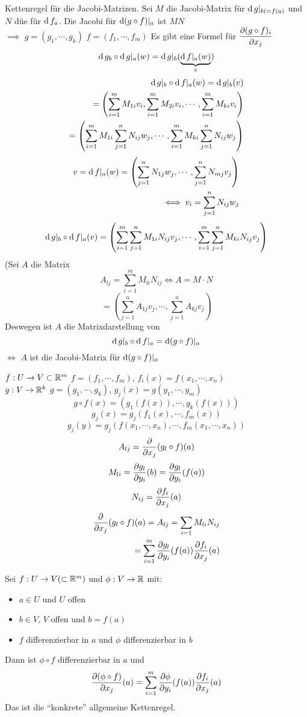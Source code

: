 \begin{Bem}
  Kettenregel für die Jacobi-Matrizen. Sei $M$ die Jacobi-Matrix für $\operatorname{d} g|_{b(=f(a)}$ und $N$ düe für $\operatorname{d} f_a$.
Die Jacobi für $\operatorname{d} (g\circ f)|_a$ ist $MN$ \\
  $\implies$ $g=(g_1,\cdots,g_k)$ $f=(f_1,\cdots,f_m)$ Es gibt eine Formel für $\dfrac{\partial (g\circ f)_i}{\partial x_j}$
  \[\operatorname{d} g_b\circ \operatorname{d} g|_a(w)=\operatorname{d} g|_b(\underbrace{\operatorname{d} f|_a(w)}_v)\]
  \begin{eqnarray*}
    \operatorname{d} g|_b\circ \operatorname{d} f|_a(w)=\operatorname{d} g|_b(v)\\
    =\left( \sum^m_{i=1}M_{1i}v_i,\sum^m_{i=1}M_{2i}v_i,\cdots,\sum^m_{i=1}M_{ki}v_i \right)\\
    =\left( \sum^m_{i=1}M_{1i}\sum^n_{j=1}N_{ij}w_j,\cdots,\sum^m_{i=1}M_{ki}\sum^n_{j=1}N_{ij}w_j \right)\\
  \end{eqnarray*}
  \begin{eqnarray*}
    v=\operatorname{d} f|_a(w)=\left( \sum^n_{j=1}N_{1j}w_j,\cdots,\sum^n_{j=1}N_{mj}v_j \right)\\
    \iff v_i=\sum^n_{j=1}N_{ij}w_j
  \end{eqnarray*}
  \[\operatorname{d} g|_b\circ \operatorname{d} f|_a(v)=\left( \sum^m_{i=1}\sum^n_{j=1}M_{1i}N_{ij}v_j,\cdots,\sum^m_{i=1}\sum^n_{j=1}M_{ki}N_{ij}v_j \right)\]
  (Sei $A$ die Matrix 
  \[A_{lj}=\sum_{i=1}^mM_{li}N_{ij} \iff A=M\cdot N\]
  \[=\left( \sum^n_{j=1}A_{1j}v_j,\cdots,\sum_{j=1}^nA_{kj}v_j \right)\]
  Deswegen ist $A$ die Matrixdarstellung von
  \[\operatorname{d} g|_b\circ \operatorname{d} f|_a=\operatorname{d} (g\circ f)|_a\]
  $\iff$ $A$ ist die Jacobi-Matrix für $\operatorname{d} (g\circ f)|_a$
\end{Bem}
\begin{Bem}
  $f:U\rightarrow V\subset\mathbb{R}^m$ $f=(f_1,\cdots,f_m)$, $f_i(x)=f(x_1,\cdots,x_n)$\\
  $g:V\rightarrow \mathbb{R}^k$ $g=(g_1,\cdots,g_k)$, $g_j(x)=g(y_1,\cdots,y_m)$\\
  \[g\circ f(x)=\left( g_1(f(x)),\cdots,g_k(f(x)) \right)\]
  \[g_j(x)=g_j(f_1(x),\cdots,f_m(x))\]
  \[g_j(y)=g_j(f(x_1,\cdots,x_n),\cdots,f_m(x_1,\cdots,x_n))\]
  \[A_{lj}=\dfrac{\partial }{\partial x_j}(g_l\circ f)(a)\]
  \[M_{li}=\dfrac{\partial g_l}{\partial y_i}(b)=\dfrac{\partial g_l}{\partial y_i}(f(a))\]
  \[N_{ij}=\dfrac{\partial f_i}{\partial x_j}(a)\]
  \begin{eqnarray*}
    \dfrac{\partial }{\partial x_j}(g_l\circ f)(a)=A_{lj}=\sum_{i=1}M_{li}N_{ij}\\
    =\sum_{i=1}^m\dfrac{\partial g_l}{\partial y_i}(f(a))\dfrac{\partial f_i}{\partial x_j}(a)
  \end{eqnarray*}
\end{Bem}
\begin{Kor}
  Sei $f:U\rightarrow V(\subset\mathbb{R}^m)$ und $\phi:V\rightarrow\mathbb{R}$ mit:
  \begin{itemize}
    \item $a\in U$ und $U$ offen
    \item $b\in V$, $V$ offen und $b=f(a)$
    \item $f$ differenzierbar in $a$ und $\phi$ differenzierbar in $b$
  \end{itemize}
  Dann ist $\phi\circ f$ differenzierbar in $a$ und
  \[\dfrac{\partial (\phi\circ f)}{\partial x_j}(a)=\sum_{i=1}^m\dfrac{\partial \phi}{\partial y_i}(f(a))\dfrac{\partial f_i}{\partial x_j}(a)\]
  Das ist die ``konkrete'' allgemeine Kettenregel.
\end{Kor}
